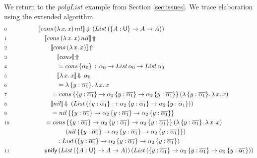 \documentclass[acmsmall,review,anonymous,prologue,dvipsnames]{acmart}\settopmatter{printfolios=true,printccs=false,printacmref=false}
\renewcommand{\U}{\mathsf{U}}
\newcommand{\unify}{\mathsf{unify}}
\newcommand{\echeckt}[2]{\llbracket#1\rrbracket\!\Downarrow\,#2}
\newcommand{\einfert}[1]{\llbracket#1\rrbracket\!\Uparrow}
\newcommand{\ol}[1]{\overline{#1}}
\theoremstyle{remark}
\begin{document}
\begin{example}
We return to the $polyList$ example from Section \ref{sec:issues}. We trace
elaboration using the extended algorithm.
\begin{alignat*}{3}
  & \scriptstyle{0 }\qquad\qquad && \echeckt{cons\,(\lambda\,x.\,x)\,nil}{(List\,(\{A : \U\}\to A \to A))}
      \hspace{14em}\\
  & \scriptstyle{1 }  && \quad \einfert{cons\,(\lambda\,x.\,x)\,nil} \\
  & \scriptstyle{2 }  && \qquad \einfert{cons\,(\lambda\,x.\,x)} \\
  & \scriptstyle{3 }  && \qquad\quad \einfert{cons}\\
  & \scriptstyle{4 }  && \qquad\quad = cons\,\{\alpha_0\}\,:\,\alpha_0 \to List\,\alpha_0 \to List\,\alpha_0\\
  & \scriptstyle{5 }  && \qquad\quad \echeckt{\lambda\,x.\,x}{\alpha_0}\\
  & \scriptstyle{6 }  && \qquad\quad = \lambda\,\{y : \ol{\alpha_1}\}.\,\lambda\,x.\,x\\
  & \scriptstyle{7 }  && \qquad = cons\,
                       \{\{y : \ol{\alpha_1}\} \to \alpha_2\,\{y : \ol{\alpha_1}\}\to \alpha_2\,\{y : \ol{\alpha_1}\}\}\,
                       (\lambda\,\{y : \ol{\alpha_1}\}.\,\lambda\,x.\,x)\\
  & \scriptstyle{8 }  && \qquad \echeckt{nil}{(List\,(\{y : \ol{\alpha_1}\} \to \alpha_2\,\{y : \ol{\alpha_1}\}\to \alpha_2\,\{y : \ol{\alpha_1}\}))}\\
  & \scriptstyle{9 }  && \qquad = nil\,\{\{y : \ol{\alpha_1}\} \to \alpha_2\,\{y : \ol{\alpha_1}\}\to \alpha_2\,\{y : \ol{\alpha_1}\}\}\\
                       & \scriptstyle{10} && \quad = cons\,\{\{y : \ol{\alpha_1}\} \to \alpha_2\,\{y : \ol{\alpha_1}\}\to \alpha_2\,\{y : \ol{\alpha_1}\}\}\,(\lambda\,\{y : \ol{\alpha_1}\}.\,\lambda\,x.\,x)\,\\
                       & && \hspace{4.4em} (nil\,\{\{y : \ol{\alpha_1}\} \to \alpha_2\,\{y : \ol{\alpha_1}\}\to \alpha_2\,\{y : \ol{\alpha_1}\}\})\\
  & && \hspace{3em} : List\,(\{y : \ol{\alpha_1}\} \to \alpha_2\,\{y : \ol{\alpha_1}\}\to \alpha_2\,\{y : \ol{\alpha_1}\})\\
  & \scriptstyle{11} && \quad \unify\,(List\,(\{A : \U\}\to A \to A))\,(List\,(\{y : \ol{\alpha_1}\} \to \alpha_2\,\{y : \ol{\alpha_1}\}\to \alpha_2\,\{y : \ol{\alpha_1}\}))\\

\end{alignat*}
\end{example}
\end{document}
